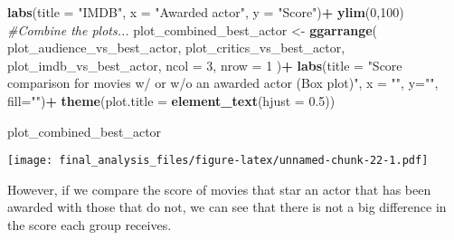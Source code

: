 \documentclass[]{article}
\newenvironment{Shaded}{\begin{snugshade}}{\end{snugshade}}
\newcommand{\KeywordTok}[1]{\textcolor[rgb]{0.13,0.29,0.53}{\textbf{#1}}}
\newcommand{\DataTypeTok}[1]{\textcolor[rgb]{0.13,0.29,0.53}{#1}}
\newcommand{\DecValTok}[1]{\textcolor[rgb]{0.00,0.00,0.81}{#1}}
\newcommand{\FloatTok}[1]{\textcolor[rgb]{0.00,0.00,0.81}{#1}}
\newcommand{\StringTok}[1]{\textcolor[rgb]{0.31,0.60,0.02}{#1}}
\newcommand{\CommentTok}[1]{\textcolor[rgb]{0.56,0.35,0.01}{\textit{#1}}}
\newcommand{\OperatorTok}[1]{\textcolor[rgb]{0.81,0.36,0.00}{\textbf{#1}}}
\newcommand{\NormalTok}[1]{#1}
\begin{document}
\begin{Shaded}
\begin{Highlighting}[]
\StringTok{  }\KeywordTok{labs}\NormalTok{(}\DataTypeTok{title =} \StringTok{"IMDB"}\NormalTok{, }\DataTypeTok{x =} \StringTok{"Awarded actor"}\NormalTok{, }\DataTypeTok{y =} \StringTok{"Score"}\NormalTok{)}\OperatorTok{+}
\StringTok{  }\KeywordTok{ylim}\NormalTok{(}\DecValTok{0}\NormalTok{,}\DecValTok{100}\NormalTok{)}
\CommentTok{#Combine the plots...}
\NormalTok{plot_combined_best_actor <-}
\StringTok{  }\KeywordTok{ggarrange}\NormalTok{(}
\NormalTok{    plot_audience_vs_best_actor,}
\NormalTok{    plot_critics_vs_best_actor,}
\NormalTok{    plot_imdb_vs_best_actor,}
    \DataTypeTok{ncol =} \DecValTok{3}\NormalTok{,}
    \DataTypeTok{nrow =} \DecValTok{1}
\NormalTok{  )}\OperatorTok{+}
\StringTok{  }\KeywordTok{labs}\NormalTok{(}\DataTypeTok{title =} \StringTok{"Score comparison for movies w/ or w/o an awarded actor (Box plot)"}\NormalTok{, }\DataTypeTok{x =} \StringTok{""}\NormalTok{, }\DataTypeTok{y=}\StringTok{""}\NormalTok{, }\DataTypeTok{fill=}\StringTok{""}\NormalTok{)}\OperatorTok{+}
\StringTok{  }\KeywordTok{theme}\NormalTok{(}\DataTypeTok{plot.title =} \KeywordTok{element_text}\NormalTok{(}\DataTypeTok{hjust =} \FloatTok{0.5}\NormalTok{))}

\NormalTok{plot_combined_best_actor}
\end{Highlighting}
\end{Shaded}

\texttt{[image: final\_analysis\_files/figure-latex/unnamed-chunk-22-1.pdf]}

However, if we compare the score of movies that star an actor that has
been awarded with those that do not, we can see that there is not a big
difference in the score each group receives.
\end{document}

